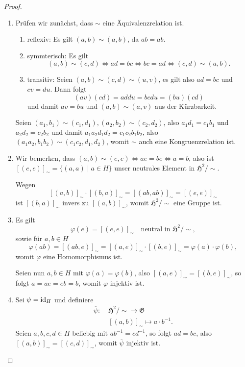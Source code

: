 \begin{proof} {\ }
    \begin{enumerate}
        \item Prüfen wir zunächst, dass $\sim$ eine Äquivalenzrelation ist.
        \begin{enumerate}
            \item reflexiv: Es gilt $(a, b) \sim (a, b)$, da $a b = a b$.
            \item symmterisch: Es gilt
            $$ (a, b) \sim (c, d) \Leftrightarrow a d = b c \Leftrightarrow b c = a d \Leftrightarrow (c, d) \sim (a, b). $$
            \item transitiv: Seien $(a, b) \sim (c, d) \sim (u, v)$, es gilt also $ad = bc$ und $cv = du$. Dann folgt
            $$ (av)(cd) = addu = bcdu = (bu)(cd) $$
            und damit $av = bu$ und $(a, b) \sim (a, v)$ aus der Kürzbarkeit.
        \end{enumerate}
        Seien $(a_1, b_1) \sim (c_1, d_1), (a_2, b_2) \sim (c_2, d_2)$, also $a_1 d_1 = c_1 b_1$ und $a_2 d_2 = c_2 b_2$ und damit $a_1 a_2 d_1 d_2 = c_1 c_2 b_1 b_2$, also $(a_1 a_2, b_1 b_2) \sim (c_1 c_2, d_1, d_2)$, womit $\sim$ auch eine Kongruenzrelation ist.

        \item Wir bemerken, dass $(a, b) \sim (e, e) \Leftrightarrow ae = be \Leftrightarrow a = b$, also ist $[(e,e)]_\sim = \{ (a, a) \mid a \in H \}$ unser neutrales Element in $\mathfrak{H}^2 / \sim$.
        
        Wegen
        $$ [(a,b)]_\sim \cdot [(b,a)]_\sim = [(ab, ab)]_\sim = [(e,e)]_\sim $$
        ist $[(b,a)]_\sim$ invers zu $[(a,b)]_\sim$, womit $\mathfrak{H}^2 / \sim$ eine Gruppe ist.

        \item Es gilt
        $$ \varphi(e) = [(e,e)]_\sim \quad \textrm{neutral in } \mathfrak{H}^2 / \sim, $$
        sowie für $a, b \in H$
        $$ \varphi(ab) = [(ab, e)]_\sim = [(a,e)]_\sim \cdot [(b,e)]_\sim = \varphi(a) \cdot \varphi(b), $$
        womit $\varphi$ eine Homomorphismus ist.

        Seien nun $a,b \in H$ mit $\varphi(a) = \varphi(b)$, also $[(a,e)]_\sim = [(b,e)]_\sim$, so folgt $a = ae = eb = b$, womit $\varphi$ injektiv ist.

        \item Sei \obda $\psi = \operatorname{id}_H$ und definiere
        \begin{align*}
            \overline{\psi} :\;& \mathfrak{H}^2 / \sim \to \mathfrak{G} \\
            & [(a,b)]_\sim \mapsto a \cdot b^{-1}.
        \end{align*}
        Seien $a,b,c,d \in H$ beliebig mit $a b^{-1} = c d^{-1}$, so folgt $ad = bc$, also $[(a,b)]_\sim = [(c,d)]_\sim$, womit $\overline{\psi}$ injektiv ist.


\end{enumerate}
\end{proof}

